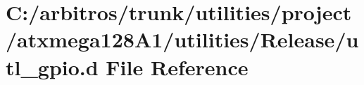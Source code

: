 \hypertarget{utilities_2project_2atxmega128_a1_2utilities_2_release_2utl__gpio_8d}{\section{C\-:/arbitros/trunk/utilities/project/atxmega128\-A1/utilities/\-Release/utl\-\_\-gpio.d File Reference}
\label{utilities_2project_2atxmega128_a1_2utilities_2_release_2utl__gpio_8d}
}
